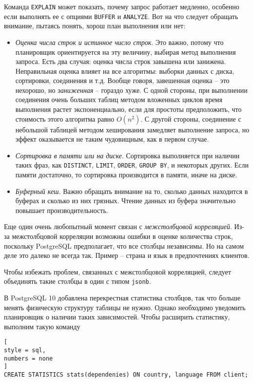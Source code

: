 \documentclass[%
	11pt,
	a4paper,
	utf8,
		]{article}
\begin{document}
Команда \texttt{EXPLAIN} может показать, почему запрос работает медленно, особенно если выполнять ее с опциями \texttt{BUFFER} и \texttt{ANALYZE}. Вот на что следует обращать внимание, пытаясь понять, хорош план выполнения или нет:
\begin{itemize}
	\item \emph{Оценка числа строк и истинное число строк}. Это важно, потому что планировщик ориентируется на эту величину, выбирая метод выполнения запроса. Есть два случая: оценка числа строк завышена или занижена. Неправильная оценка влияет на все алгоритмы: выборки данных с диска, сортировки, соединения и т.д. Вообще говоря, завешенная оценка -- это нехорошо, но \emph{заниженная} -- гораздо хуже. С одной стороны, при выполнении соединения очень больших таблиц методом вложенных циклов время выполнения растет экспоненциально, если для простоты предположить, что стоимость этого алгоритма равно $ O(n^2) $. С другой стороны, соединение с небольшой таблицей методом хеширования замедляет выполнение запроса, но эффект оказывается не таким чудовищным, как в первом случае.
	
	\item \emph{Сортировка в памяти или на диске}. Сортировка выполняется при наличии таких фраз, как \texttt{DISTINCT}, \texttt{LIMIT}, \texttt{ORDER}, \texttt{GROUP BY}, и некоторых других. Если памяти достаточно, то сортировка производится в памяти, иначе на диске.
	
	\item \emph{Буферный кеш}. Важно обращать внимание на то, сколько данных находится в буферах и сколько из них грязных. Чтение данных из буфера значительно повышает производительность.
\end{itemize}


Еще один очень любопытный момент связан с \emph{межстолбцовой корреляцией}. Из-за межстолбцовой корреляции возможны ошибки в оценке количества строк, поскольку PostgreSQL предполагает, что все столбцы независимы. Но на самом деле это далеко не всегда так. Пример -- страна и язык в предпочтениях клиентов. 

Чтобы избежать проблем, связанных с межстолбцовой корреляцией, следует объединять такие столбцы в один с типом \texttt{jsonb}.

В PostgreSQL 10 добавлена перекрестная статистика столбцов, так что больше менять физическую структуру таблицы не нужно. Однако необходимо уведомить планировщик о наличии таких зависимостей. Чтобы расширить статистику, выполним такую команду
\begin{lstlisting}[
style = sql,
numbers = none
]
CREATE STATISTICS stats(dependenies) ON country, language FROM client;
\end{lstlisting}
\end{document}

